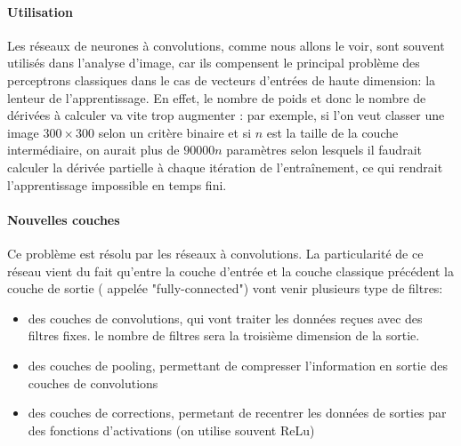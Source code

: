 \documentclass[
    10pt,
    a4paper,
    oneside,
    headinclude,footinclude,
    BCOR=5mm,
    captions=tableabove
]{scrartcl}
\begin{document}
\paragraph{Utilisation}
Les réseaux de neurones à convolutions, comme nous allons le voir, sont souvent utilisés dans l'analyse d'image, car ils compensent le principal problème des perceptrons classiques dans le cas de vecteurs d'entrées de haute dimension: la lenteur de l'apprentissage. En effet, le nombre de poids et donc le nombre de dérivées à calculer va vite trop augmenter : par exemple, si l'on veut classer une image $300\times300$ selon un critère binaire et si $n$ est la taille de la couche intermédiaire, on aurait plus de $90000 n$ paramètres selon lesquels il faudrait calculer la dérivée partielle à chaque itération de l'entraînement, ce qui rendrait l'apprentissage impossible en temps fini. 

\paragraph{Nouvelles couches}
Ce problème est résolu par les réseaux à convolutions. La particularité de ce réseau vient du fait qu'entre la couche d'entrée et la couche classique précédent la couche de sortie ( appelée "fully-connected") vont venir plusieurs type de filtres:
\begin{itemize}
	\item des couches de convolutions, qui vont traiter les données reçues avec des filtres fixes. le nombre de filtres sera la troisième dimension de la sortie.
	\item des couches de pooling, permettant de compresser l'information en sortie des couches de convolutions
	\item des couches de corrections, permetant de recentrer les données de sorties par des fonctions d'activations (on utilise souvent ReLu)
\end{itemize}
\end{document}
